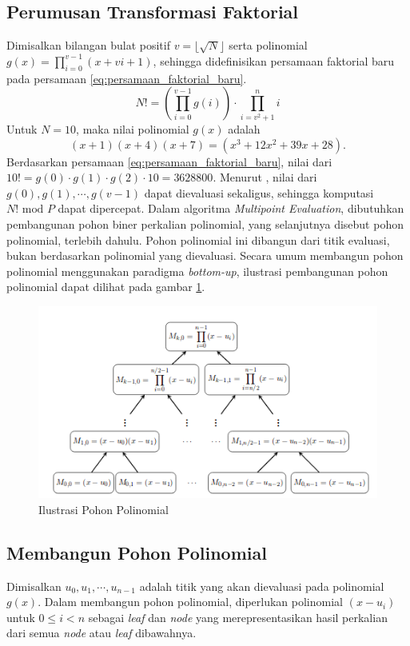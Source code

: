 \subsection{ Perumusan Transformasi Faktorial}
\label{sec:perumusan_transformasi_faktorial}
Dimisalkan bilangan bulat positif $ v = \lfloor \sqrt{N} \rfloor $ serta polinomial $ g(x) = \prod_{i=0}^{v-1} (x + vi + 1) $, sehingga didefinisikan persamaan faktorial baru pada persamaan \eqref{eq:persamaan_faktorial_baru}.
\begin{equation}
	N ! = \left( \prod_{i=0}^{v-1} g(i) \right) \cdot \prod_{i=v^2+1}^n i
	\label{eq:persamaan_faktorial_baru}
\end{equation}
Untuk $ N = 10 $, maka nilai polinomial $g(x)$ adalah $$ (x+1)(x+4)(x+7) = (x^3 + 12x^2 + 39x + 28). $$ Berdasarkan persamaan \eqref{eq:persamaan_faktorial_baru}, nilai dari $ 10! = g(0) \cdot g(1) \cdot g(2) \cdot 10 = 3628800 $. 
Menurut \cite{multipoint_evaluation}, nilai dari $ g(0), g(1), \cdots , g(v-1) $ dapat dievaluasi sekaligus, sehingga komputasi $ N! \text{ mod } P $ dapat dipercepat.
\newpage
Dalam algoritma \textit{Multipoint Evaluation}, dibutuhkan pembangunan pohon biner perkalian polinomial, yang selanjutnya disebut pohon polinomial, terlebih dahulu. Pohon polinomial ini dibangun dari titik evaluasi, bukan berdasarkan polinomial yang dievaluasi. Secara umum membangun pohon polinomial menggunakan paradigma \textit{bottom-up}, ilustrasi pembangunan pohon polinomial dapat dilihat pada gambar \ref{fig:ilustrasi-pohon-polinomial}.

\begin{figure}
	\Centering
	\includegraphics [scale=0.6]{bab2/img/ilustrasi-pohon-polinomial}
	\caption {Ilustrasi Pohon Polinomial}
	\label {fig:ilustrasi-pohon-polinomial}
\end{figure}

\subsection{ Membangun Pohon Polinomial}
\label{sec:membangun_pohon_polinomial}
Dimisalkan $ u_0, u_1, \cdots , u_{n-1} $ adalah titik yang akan dievaluasi pada polinomial $ g(x) $. Dalam membangun pohon polinomial, diperlukan polinomial $( x - u_i) $ untuk $ 0 \leq i < n $ sebagai \textit{leaf} dan \textit{node} yang merepresentasikan hasil perkalian dari semua \textit{node} atau \textit{leaf} dibawahnya. 

